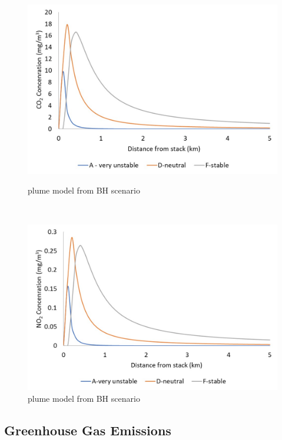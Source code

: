 \begin{figure}[t!]
    \centering
    \begin{minipage}[t]{0.5\textwidth}
        \centering
        \includegraphics[width=\linewidth]{figures/CO2plumeBH.jpg}
        \caption{ plume model from BH scenario}
        \label{fig:CO2plumeBH}
    \end{minipage}%
    ~ 
    \begin{minipage}[t]{0.5\textwidth}
        \centering
        \includegraphics[width=\linewidth]{figures/NO2plumeBH.jpg}
        \caption{ plume model from BH scenario}
         \label{fig:NO2plumeBH}
    \end{minipage}
    
\end{figure}


\subsection{Greenhouse Gas Emissions}

